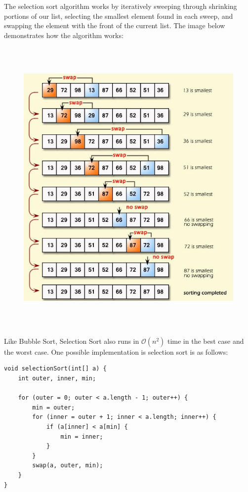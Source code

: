 The selection sort algorithm works by iteratively sweeping through shrinking portions of our list, selecting the smallest element found in each sweep, and swapping the element with the front of the current list. The image below demonstrates how the algorithm works:
 
\begin{figure}[h]
\includegraphics[width=\textwidth, height=15cm]{ssort.jpg}
\centering
\end{figure}

\newpage


Like Bubble Sort, Selection Sort also runs in $\mathcal{O}(n^2)$ time in the best case and the worst case. One possible implementation is selection sort is as follows:

\begin{lstlisting}
void selectionSort(int[] a) {
    int outer, inner, min;
    
    for (outer = 0; outer < a.length - 1; outer++) {
        min = outer;
        for (inner = outer + 1; inner < a.length; inner++) {
            if (a[inner] < a[min] {
                min = inner;
            }
        }
        swap(a, outer, min);
    }
}
\end{lstlisting}


